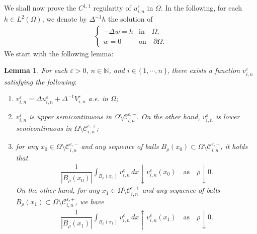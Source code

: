 \documentclass[12pt]{amsart}
\newtheorem{lem}{Lemma}[section]
\begin{document}
We shall now prove the $C^{1,1}$ regularity of $u^{\varepsilon}_{i,n}$ in $\Omega$. 
In the following, for each $h \in L^{2}(\Omega)$, we denote by $\Delta^{-1} h$ the solution of 
\begin{align*}
\begin{cases}
- \Delta w = h & \text{in} \quad \Omega, \\
w = 0 & \text{on} \quad {\partial} \Omega. 
\end{cases}
\end{align*}
We start with the following lemma: 
\begin{lem} \label{version-prop}
For each ${\varepsilon}>0$, $n \in {\mathbb{N}}$, and $i \in \{\, 1, \cdots, n \,\}$, there exists a function $v^{\varepsilon}_{i,n}$ satisfying the following$\colon$ 
\begin{enumerate}
\item[{\rm (a)}] $v^{\varepsilon}_{i,n} = \Delta u^{\varepsilon}_{i,n} + \Delta^{-1} V^{\varepsilon}_{i,n}$ a.e. in $\Omega${\rm ;}  
\item[{\rm (b)}] $v^{\varepsilon}_{i,n}$ is upper semicontinuous in $\Omega \setminus {\mathcal{C}}^{{\varepsilon},-}_{i,n}$. 
On the other hand, $v^{\varepsilon}_{i,n}$ is lower semicontinuous in $\Omega \setminus {\mathcal{C}}^{{\varepsilon},+}_{i,n}${\rm ;} 
\item[{\rm (c)}] for any $x_0 \in \Omega \setminus {\mathcal{C}}^{{\varepsilon},-}_{i,n}$ and any sequence of balls 
$B_\rho(x_0) \subset \Omega \setminus {\mathcal{C}}^{{\varepsilon},-}_{i,n}$, it holds that 
\begin{align*}
\dfrac{1}{{\left| {B_\rho(x_0)} \right|}} \int_{B_\rho(x_0)} v^{\varepsilon}_{i,n} \, dx \downarrow v^{\varepsilon}_{i,n}(x_0) 
\quad \text{as} \quad \rho \downarrow 0. 
\end{align*}
On the other hand, for any $x_1 \in \Omega \setminus {\mathcal{C}}^{{\varepsilon},+}_{i,n}$ and any sequence of balls 
$B_\rho(x_1) \subset \Omega \setminus {\mathcal{C}}^{{\varepsilon},+}_{i,n}$, we have 
\begin{align*}
\dfrac{1}{{\left| {B_\rho(x_1)} \right|}} \int_{B_\rho(x_1)} v^{\varepsilon}_{i,n} \, dx \uparrow v^{\varepsilon}_{i,n}(x_1) 
\quad \text{as} \quad \rho \downarrow 0. 
\end{align*}
\end{enumerate}
\end{lem}
\end{document}
